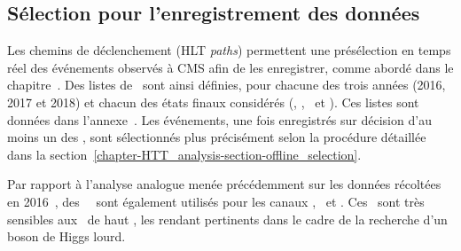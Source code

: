 \subsection{Sélection pour l'enregistrement des données}\label{chapter-HTT_analysis-section-triggers}
Les chemins de déclenchement (HLT \emph{paths}) permettent une présélection en temps réel des événements observés à CMS afin de les enregistrer, comme abordé dans le chapitre~.
Des listes de \HLTpaths\ sont ainsi définies, pour chacune des trois années (2016, 2017 et 2018) et chacun des états finaux considérés (\tauh\tauh, \mu\tauh, \ele\tauh\ et \ele\mu).
Ces listes sont données dans l'annexe~.
Les événements, une fois enregistrés sur décision d'au moins un des \HLTpaths, sont sélectionnés plus précisément selon la procédure détaillée dans la section~\ref{chapter-HTT_analysis-section-offline_selection}.
\par
Par rapport à l'analyse analogue menée précédemment sur les données récoltées en 2016~\cite{CMS-PAS-HIG-17-020}, des \HLTpaths\ \HLTSingleTau\ sont également utilisés pour les canaux \tauh\tauh, \mu\tauh\ et \ele\tauh.
Ces \HLTpaths\ sont très sensibles aux \tauh\ de haut \pT, les rendant pertinents dans le cadre de la recherche d'un boson de Higgs lourd.

%
%

